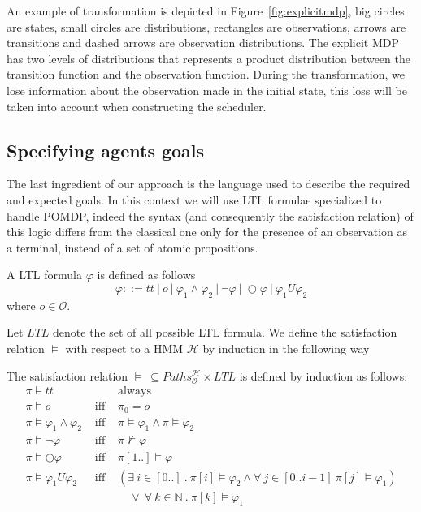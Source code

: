 An example of transformation is depicted in Figure~\ref{fig:explicitmdp}, big circles are states, small circles are distributions, rectangles are observations, arrows are transitions and dashed arrows are observation distributions. The explicit \ac{MDP} has two levels of distributions that represents a product distribution between the transition function and the observation function. During the transformation, we lose information about the observation made in the initial state, this loss will be taken into account when constructing the scheduler.

\vspace{-.3cm}
\subsection{Specifying agents goals} %
\label{sub:specify_agents_goals}

The last ingredient of our approach is the language used to describe the required and expected goals. In this context we will use \ac{LTL} formulae specialized to handle \ac{POMDP}, indeed the syntax (and consequently the satisfaction relation) of this logic differs from the classical one only for the presence of an observation as a terminal, instead of a set of atomic propositions.

\begin{definition}
A \ac{LTL} formula $\varphi$ is defined as follows
$$ \varphi ::= tt\ |\ o\ |\ \varphi_1 \wedge \varphi_2\ |\ \neg\varphi\ |\ \bigcirc \varphi\ |\ \varphi_1 U \varphi_2 $$
where $o \in \mathcal{O}$.
\end{definition}

Let $LTL$ denote the set of all possible \ac{LTL} formula. We define the satisfaction relation $\models$ with respect to a \ac{HMM} $\mathcal{H}$ by induction in the following way

\begin{definition}
The satisfaction relation $\models\ \subseteq Paths_\mathcal{O}^\mathcal{H}\times LTL$ is defined by induction as follows:
$$
\begin{array}{lll}
	\pi \models tt & & \text{always} \\
	\pi \models o & \text{ iff } & \pi_0 = o \\
	\pi \models \varphi_1 \wedge \varphi_2 & \text{ iff } & \pi \models \varphi_1 \wedge \pi \models \varphi_2 \\
	\pi \models \neg \varphi & \text{ iff } & \pi \not\models \varphi \\
	\pi \models \bigcirc \varphi & \text{ iff } & \pi[1..] \models \varphi \\
	\pi \models \varphi_1 U \varphi_2 & \text{ iff } & (\exists\ i \in [0..]\ .\ \pi[i] \models \varphi_2 \wedge \forall\ j \in [0..i-1]\ \pi[j] \models \varphi_1) \\
	&& \quad \vee\ \forall\ k \in \mathbb{N}\ .\ \pi[k] \models \varphi_1 \\
\end{array}
$$
\end{definition}

